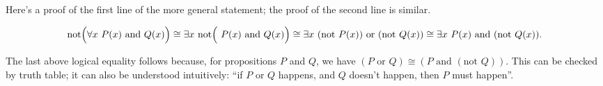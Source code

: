 
Here's a proof of the first line of the more general statement; the proof of the second line is similar.

\begin{align*}
    \text{not}\Big( \forall x \text{ } P(x) \text{ and } Q(x) \Big)
    \cong
    \exists x \text{ } \text{not}\Big( \text{ } P(x) \text{ and } Q(x) \Big)
    \cong
    \exists x \text{ } (\text{not } P(x)) \text{ or } (\text{not } Q(x))
    \cong
    \exists x \text{ } P(x) \text{ and } (\text{not } Q(x)).
\end{align*}

The last above logical equality follows because, for propositions $P$ and $Q$, we have $(P \text{ or } Q) \cong (P \text{ and } (\text{not } Q))$. This can be checked by truth table; it can also be understood intuitively: ``if $P$ or $Q$ happens, and $Q$ doesn't happen, then $P$ must happen''.

